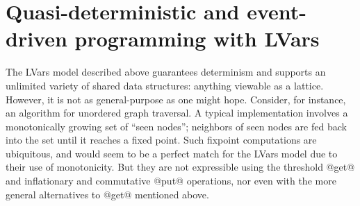 \section{Quasi-deterministic and event-driven programming with LVars}\label{s:intro-quasi}

The LVars model described above guarantees determinism and supports an
unlimited variety of shared data structures: anything viewable as a
lattice.  However, it is not as general-purpose as one might hope.
Consider, for instance, an algorithm for unordered graph traversal.  A
typical implementation involves a monotonically growing set of ``seen
nodes''; neighbors of seen nodes are fed back into the set until it
reaches a fixed point.  Such fixpoint computations are ubiquitous, and
would seem to be a perfect match for the LVars model due to their use
of monotonicity.  But they are not expressible using the threshold
@get@ and inflationary and commutative @put@ operations, nor even with the more
general alternatives to @get@ mentioned above.

